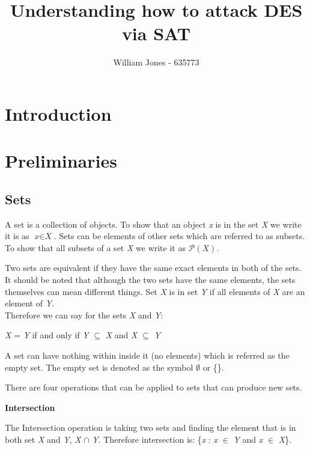 \documentclass[11pt,a4paper]{report}
\author{William Jones - 635773}
\begin{document}
\title{Understanding how to attack DES via SAT}
\maketitle
\tableofcontents

\chapter{Introduction}
\label{cha:Introduction}


\chapter{Preliminaries}
\label{cha:prelim}


\section{Sets}
\label{sec:sets}

A set is a collection of objects. To show that an object \textit{x} is in the set \textit{X} we write it is as $\textit{x} \in \textit{X}$. Sets can be elements of other sets which are referred to as subsets. To show that all subsets of a set \textit{X} we write it as $\mathcal{P}(\textit{X})$. 


\noindent Two sets are equivalent if they have the same exact elements in both of the sets. It should be noted that although the two sets have the same elements, the sets themselves can mean different things. Set \textit{X} is in set \textit{Y} if all elements of \textit{X} are an element of \textit{Y}.\\
Therefore we can say for the sets \textit{X} and \textit{Y}:

\begin{center}
{\textit{X} = \textit{Y} if and only if \textit{Y} $\subseteq$ \textit{X} and \textit{X} $\subseteq$ \textit{Y}}
\end{center}

\noindent A set can have nothing within inside it (no elements) which is referred as the empty set. The empty set is denoted as the symbol $\emptyset$ or \{\}.


\noindent There are four operations that can be applied to sets that can produce new sets.  

\textbf{Intersection} 

\indent The Intersection operation is taking two sets and finding the element that is in both set \textit{X} and \textit{Y}, \textit{X} $\cap$ \textit{Y}. Therefore intersection is: \{\textit{x} : \textit{x} $\in$ \textit{Y} and \textit{x} $\in$ \textit{X}\}. 
\end{document}
